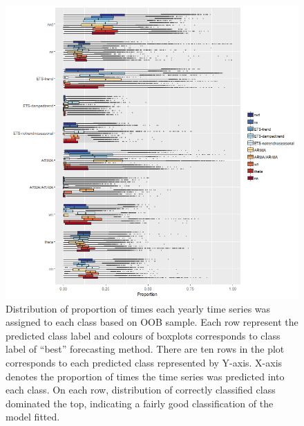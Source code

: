 \documentclass[11pt,a4paper,]{article}
\begin{document}
\begin{figure}
\centering
\includegraphics{figures/yearlyoob-1.png}
\caption{\label{fig:yearlyoob}Distribution of proportion of times each
yearly time series was assigned to each class based on OOB sample. Each
row represent the predicted class label and colours of boxplots
corresponds to class label of ``best'' forecasting method. There are ten
rows in the plot corresponds to each predicted class represented by
Y-axis. X-axis denotes the proportion of times the time series was
predicted into each class. On each row, distribution of correctly
classified class dominated the top, indicating a fairly good
classification of the model fitted.}
\end{figure}
\end{document}
